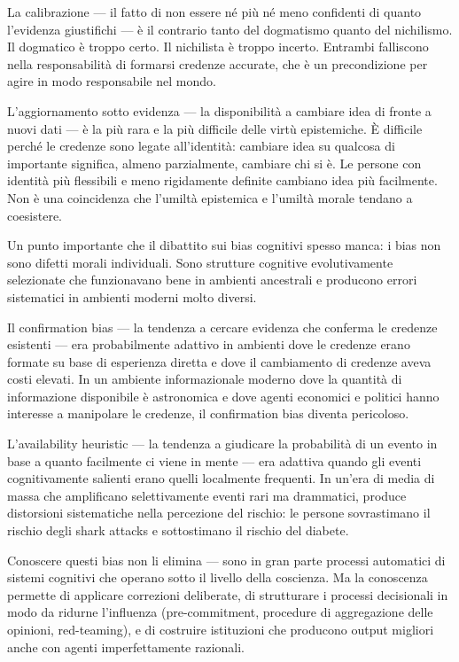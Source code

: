 \documentclass[12pt,a4paper,openany]{book}
\newcommand{\sezione}[1]{\vspace{1.2em}{\large\bfseries #1}\vspace{0.5em}\par}
\begin{document}
La calibrazione --- il fatto di non essere né più né meno confidenti di quanto l'evidenza giustifichi --- è il contrario tanto del dogmatismo quanto del nichilismo. Il dogmatico è troppo certo. Il nichilista è troppo incerto. Entrambi falliscono nella responsabilità di formarsi credenze accurate, che è un precondizione per agire in modo responsabile nel mondo.

L'aggiornamento sotto evidenza --- la disponibilità a cambiare idea di fronte a nuovi dati --- è la più rara e la più difficile delle virtù epistemiche. È difficile perché le credenze sono legate all'identità: cambiare idea su qualcosa di importante significa, almeno parzialmente, cambiare chi si è. Le persone con identità più flessibili e meno rigidamente definite cambiano idea più facilmente. Non è una coincidenza che l'umiltà epistemica e l'umiltà morale tendano a coesistere.

\sezione{I bias cognitivi come struttura, non come colpa}

Un punto importante che il dibattito sui bias cognitivi spesso manca: i bias non sono difetti morali individuali. Sono strutture cognitive evolutivamente selezionate che funzionavano bene in ambienti ancestrali e producono errori sistematici in ambienti moderni molto diversi.

Il confirmation bias --- la tendenza a cercare evidenza che conferma le credenze esistenti --- era probabilmente adattivo in ambienti dove le credenze erano formate su base di esperienza diretta e dove il cambiamento di credenze aveva costi elevati. In un ambiente informazionale moderno dove la quantità di informazione disponibile è astronomica e dove agenti economici e politici hanno interesse a manipolare le credenze, il confirmation bias diventa pericoloso.

L'availability heuristic --- la tendenza a giudicare la probabilità di un evento in base a quanto facilmente ci viene in mente --- era adattiva quando gli eventi cognitivamente salienti erano quelli localmente frequenti. In un'era di media di massa che amplificano selettivamente eventi rari ma drammatici, produce distorsioni sistematiche nella percezione del rischio: le persone sovrastimano il rischio degli shark attacks e sottostimano il rischio del diabete.

Conoscere questi bias non li elimina --- sono in gran parte processi automatici di sistemi cognitivi che operano sotto il livello della coscienza. Ma la conoscenza permette di applicare correzioni deliberate, di strutturare i processi decisionali in modo da ridurne l'influenza (pre-commitment, procedure di aggregazione delle opinioni, red-teaming), e di costruire istituzioni che producono output migliori anche con agenti imperfettamente razionali.
\end{document}
